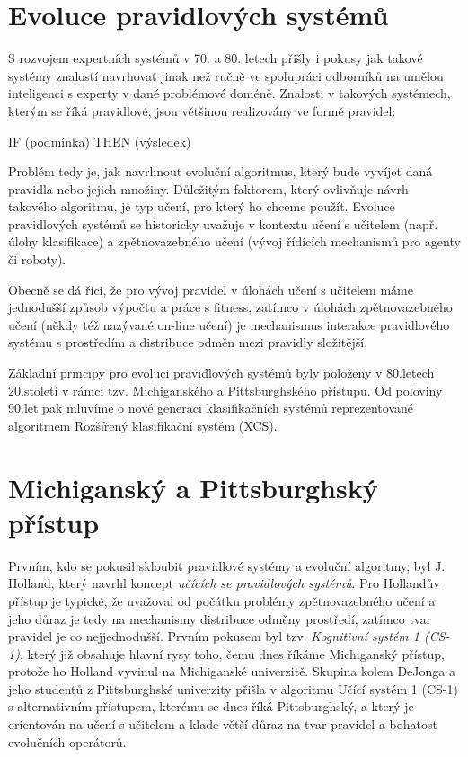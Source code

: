 \section{Evoluce pravidlových systémů}

S rozvojem expertních systémů v 70. a 80. letech přišly i pokusy jak takové systémy znalostí navrhovat jinak než ručně ve spolupráci odborníků na umělou inteligenci s experty v dané problémové doméně. Znalosti v takových systémech, kterým se říká pravidlové, jsou většinou realizovány ve formě pravidel: 

IF (podmínka) THEN (výsledek)

Problém tedy je, jak navrhnout evoluční algoritmus, který bude vyvíjet daná pravidla nebo jejich množiny. Důležitým faktorem, který ovlivňuje návrh takového algoritmu, je typ učení, pro který ho chceme použít. Evoluce pravidlových systémů se historicky uvažuje v kontextu učení s učitelem (např. úlohy klasifikace) a zpětnovazebného učení (vývoj řídících mechanismů pro agenty či roboty). 

Obecně se dá říci, že pro vývoj pravidel v úlohách učení s učitelem máme jednodušší způsob výpočtu a práce s fitness, zatímco v úlohách zpětnovazebného učení (někdy též nazývané on-line učení) je mechanismus interakce pravidlového systému s prostředím a distribuce odměn mezi pravidly složitější.  

Základní principy pro evoluci pravidlových systémů byly položeny v 80.letech 20.století v rámci tzv. Michiganského a Pittsburghského přístupu. Od poloviny 90.let pak mluvíme o nové generaci klasifikačních systémů reprezentované algoritmem Rozšířený klasifikační systém (XCS). 


\section{Michiganský a Pittsburghský přístup}

Prvním, kdo se pokusil skloubit pravidlové systémy a evoluční algoritmy, byl J. Holland, který navrhl koncept \emph{učících se pravidlových systémů}. Pro Hollandův přístup je typické, že uvažoval od počátku problémy zpětnovazebného učení a jeho důraz je tedy na mechanismy distribuce odměny prostředí, zatímco tvar pravidel je co nejjednodušší. Prvním pokusem byl tzv. \emph{Kognitivní systém 1 (CS-1)}, který již obsahuje hlavní rysy toho, čemu dnes říkáme Michiganský přístup, protože ho Holland vyvinul na Michiganské univerzitě. Skupina kolem DeJonga a jeho studentů z Pittsburghské univerzity přišla v algoritmu Učící systém 1 (CS-1) s alternativním přístupem, kterému se dnes říká Pittsburghský, a který je orientován na učení s učitelem a klade větší důraz na tvar pravidel a bohatost evolučních operátorů. 

